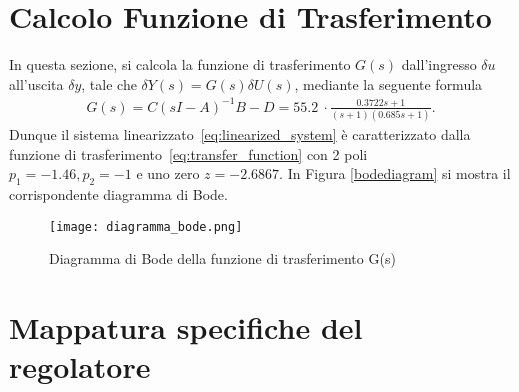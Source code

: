 \documentclass[a4paper, 11pt]{article}
\begin{document}
\clearpage
\section{Calcolo Funzione di Trasferimento}

In questa sezione, si calcola la funzione di trasferimento $G(s)$ dall'ingresso $\delta u$ all'uscita $\delta y$, tale che $\delta Y(s) = G(s)\delta U(s)$,   mediante la seguente formula 
%
%
\begin{align}\label{eq:transfer_function}
G(s) = C(sI-A)^{-1}B-D = 55.2\ \cdot \frac{0.3722s+1}{(s+1)(0.685s+1)}.
\end{align}
%
Dunque il sistema linearizzato~\eqref{eq:linearized_system} è caratterizzato dalla funzione di trasferimento~\eqref{eq:transfer_function} con 2 poli \\ $p_1 = -1.46,  p_2=-1$ e uno zero $z = -2.6867$. In Figura \eqref{bodediagram} si mostra il corrispondente diagramma di Bode. 

\begin{figure}[h!]
    \centering
    \texttt{[image: diagramma\_bode.png]}
    \caption{Diagramma di Bode della funzione di trasferimento G(s)}
    \label{bodediagram}
\end{figure}

\clearpage
\section{Mappatura specifiche del regolatore}
\label{sec:specifications}
\end{document}
